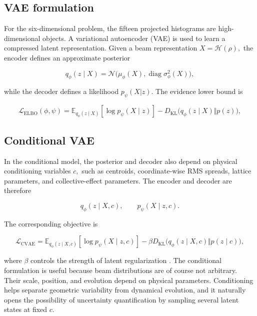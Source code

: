 \subsection{VAE formulation}
\label{sec:04_machine_learning_methodology_vae_formulation}

For the six-dimensional problem, the fifteen projected histograms are high-dimensional objects. A variational autoencoder (VAE) is used to learn a compressed latent representation. Given a beam representation \(X = \mathcal{H} ( \rho ) ,\) the encoder defines an approximate posterior

\begin{equation}
\label{eq:138}
q_{\phi}(z\mid X)=\mathcal N\bigl(\mu_{\phi}(X),\operatorname{diag}\sigma_{\phi}^2(X)\bigr),
\end{equation}

while the decoder defines a likelihood \(p_{\psi} ( X | z ) .\) The evidence lower bound is

\begin{equation}
\label{eq:139}
\mathcal L_{\mathrm{ELBO}}(\phi,\psi)=\mathbb E_{q_{\phi}(z\mid X)}[\log p_{\psi}(X\mid z)]-D_{\mathrm{KL}}\bigl(q_{\phi}(z\mid X)\Vert p(z)\bigr),
\end{equation}

\subsection{Conditional VAE}
\label{sec:04_machine_learning_methodology_conditional_vae}

In the conditional model, the posterior and decoder also depend on physical conditioning variables \(c ,\) such as centroids, coordinate-wise RMS spreads, lattice parameters, and collective-effect parameters. The encoder and decoder are therefore

\begin{equation}
\label{eq:140}
q_{\phi}(z\mid X,c),\qquad p_{\psi}(X\mid z,c).
\end{equation}

The corresponding objective is

\begin{equation}
\label{eq:141}
\mathcal L_{\mathrm{CVAE}}=\mathbb E_{q_{\phi}(z\mid X,c)}[\log p_{\psi}(X\mid z,c)]-\beta D_{\mathrm{KL}}\bigl(q_{\phi}(z\mid X,c)\Vert p(z\mid c)\bigr),
\end{equation}

where \(\beta\) controls the strength of latent regularization \cite{sohn2015cvae}. The conditional formulation is useful because beam distributions are of course not arbitrary. Their scale, position, and evolution depend on physical parameters. Conditioning helps separate geometric variability from dynamical evolution, and it naturally opens the possibility of uncertainty quantification by sampling several latent states at fixed \(c .\)

